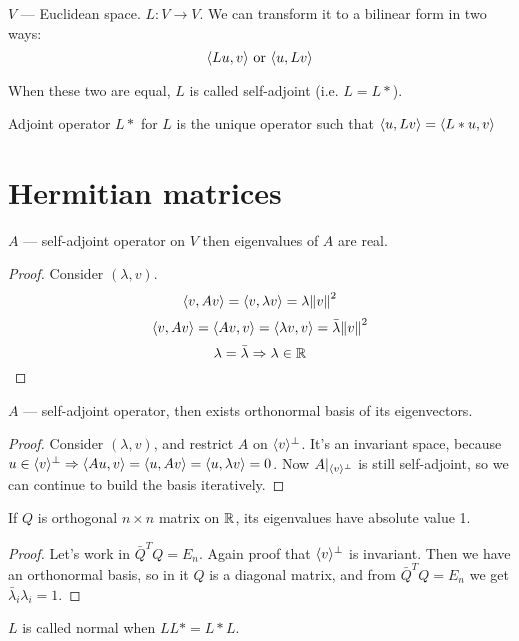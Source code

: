 
\title{}
\author{}
\date{16 May 2022}

\maketitle

$V$ --- Euclidean space. $L: V \to V$. We can transform it to a bilinear form in two ways:
\[ \langle Lu, v \rangle \text{ or } \langle u, Lv \rangle \] 

When these two are equal, $L$ is called self-adjoint (i.e. $L = L*$).

\begin{df} Adjoint operator $L*$ for $L$ is the unique operator such that $\langle u, Lv \rangle = \langle L*u, v \rangle$ \end{df}

\section*{Hermitian matrices}

\begin{thr}
    $A$ --- self-adjoint operator on $V$ then eigenvalues of $A$ are real.
\end{thr}
\begin{proof}
Consider $(\lambda, v)$.
\[ \langle v, Av \rangle = \langle v, \lambda v \rangle = \lambda \norm{v}^2 \] 
\[ \langle v, Av \rangle = \langle Av, v \rangle = \langle \lambda v, v \rangle = \bar \lambda \norm{v}^2 \]
\[ \lambda = \bar \lambda \Rightarrow \lambda \in \mathbb R \] 
\end{proof} 

\begin{thr}
    $A$ --- self-adjoint operator, then exists orthonormal basis of its eigenvectors.
\end{thr}
\begin{proof}
    Consider $(\lambda, v)$, and restrict $A$ on $\langle v \rangle^\perp$. It's an invariant space, because 
    $u \in \langle v \rangle^\perp \Rightarrow \langle Au, v \rangle = \langle u, Av \rangle = \langle u, \lambda v \rangle = 0 $.
    Now $A|_{\langle v \rangle^\perp}$ is still self-adjoint, so we can continue to build the basis iteratively.
\end{proof}

\begin{thr}
    If $Q$ is orthogonal $n \times n$ matrix on $\mathbb R$, its eigenvalues have absolute value 1.
\end{thr}
\begin{proof}
    Let's work in $\bar Q^T Q = E_n$.
    Again proof that $\langle v \rangle^\perp$ is invariant. Then we have an orthonormal basis,
    so in it $Q$ is a diagonal matrix, and from $\bar Q^T Q = E_n$ we get $\bar \lambda_i \lambda_i = 1$.
\end{proof}

\begin{df} $L$ is called normal when $LL* = L*L$. \end{df}

